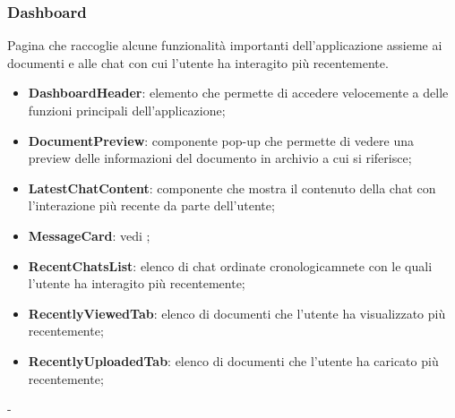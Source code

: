 \documentclass[10pt, a4paper]{article}
\begin{document}
    \subsubsection{Dashboard}
    Pagina che raccoglie alcune funzionalità importanti dell'applicazione assieme ai documenti e alle chat con cui l'utente ha interagito più recentemente.
    \begin{itemize}
        \item \label{DashboardHeader}\textbf{DashboardHeader}: elemento che permette di accedere velocemente a delle funzioni principali dell'applicazione;
        \item \label{DocumentPreview}\textbf{DocumentPreview}: componente pop-up che permette di vedere una preview delle informazioni del documento in archivio a cui si riferisce;       
        \item \label{LatestChatContent}\textbf{LatestChatContent}: componente che mostra il contenuto della chat con l'interazione più recente da parte dell'utente;
        \item \textbf{MessageCard}: vedi ; 
        \item \label{RecentChatsList}\textbf{RecentChatsList}: elenco di chat ordinate cronologicamnete con le quali l'utente ha interagito più recentemente;
        \item \label{RecentlyViewedTab}\textbf{RecentlyViewedTab}: elenco di documenti che l'utente ha visualizzato più recentemente;
        \item \label{RecentlyUploadedTab}\textbf{RecentlyUploadedTab}: elenco di documenti che l'utente ha caricato più recentemente;
       
    \end{itemize}
     -
    
\end{document}
